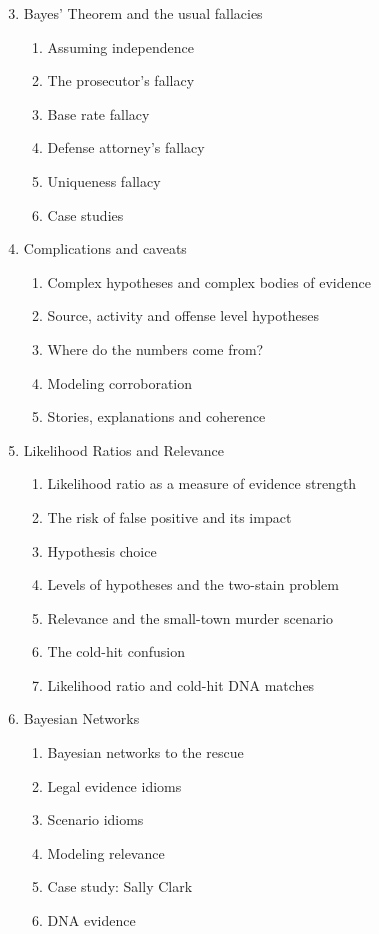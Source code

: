 \documentclass[10pt,dvipsnames,enabledeprecatedfontcommands]{scrartcl}
\begin{document}
\begin{enumerate}
\begin{enumerate}
\setcounter{enumii}{2}
  \item  Bayes' Theorem and the usual fallacies
  \begin{enumerate}
  \item  Assuming independence
  \item  The prosecutor's fallacy
  \item  Base rate fallacy
  \item  Defense attorney's fallacy
  \item  Uniqueness fallacy
  \item  Case studies
  \end{enumerate}

  
  
  \item  Complications and caveats
  \begin{enumerate}
  \item  Complex hypotheses and complex bodies of evidence
  \item Source, activity and offense level hypotheses
  \item  Where do the numbers come from?
  \item  Modeling corroboration
  \item  Stories, explanations and coherence
  \end{enumerate}

  
  \item  Likelihood Ratios and Relevance
  \begin{enumerate}
  \item Likelihood ratio as a measure of evidence strength
  \item The risk of false positive and its impact
  \item Hypothesis choice
  \item Levels of hypotheses and the two-stain problem
  \item Relevance and the small-town murder scenario
  \item The cold-hit confusion
  \item  Likelihood ratio and  cold-hit DNA matches
  \end{enumerate}



  \item  Bayesian Networks
  \begin{enumerate}
  \item  Bayesian networks to the rescue
  \item  Legal evidence idioms
  \item Scenario idioms
  \item Modeling relevance
  \item  Case study: Sally Clark
  \item DNA evidence
  \end{enumerate}
  

\end{enumerate}
\end{enumerate}
\end{document}
